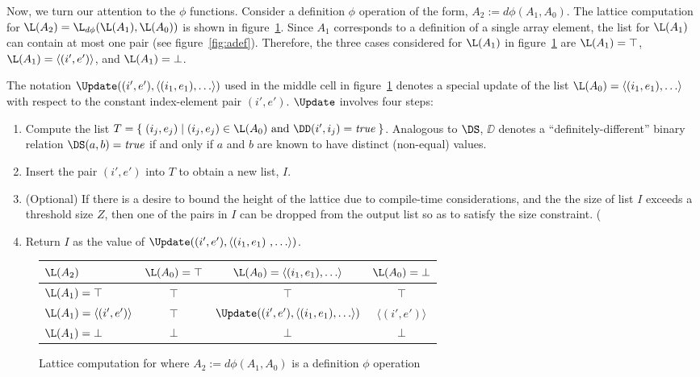 Now, we turn our attention to the $\phi$ functions. 
Consider a
definition $\phi$ operation
of the form, $A_2 := d\phi(A_1, A_0)$.  
The lattice computation for $\L(A_2) = \L_{d\phi}(\L(A_1), \L(A_0))$
is shown in figure~\ref{fig:dphi}.  Since $A_1$ corresponds to a definition
of a single array element, the list for $\L(A_1)$ can contain
at most one pair (see figure~\ref{fig:adef}).
Therefore, the three cases considered for $\L(A_1)$ in figure~\ref{fig:dphi}
are $\L(A_1) = \top$, $\L(A_1) = \langle(i',e')\rangle$, and
 $\L(A_1) = \bot$.

The notation 
$\Update((i',e'),\langle (i_1,e_1), \ldots \rangle)$
used in the middle cell in 
figure~\ref{fig:dphi} denotes a special update of 
the list $\L(A_0) = \langle (i_1,e_1), \ldots \rangle$
with respect to the constant
index-element pair $(i',e')$. $\Update$ involves four steps\label{def:update}:
\begin{enumerate}
\item Compute the list $T = \{\;(i_j,e_j)\;|\;(i_j,e_j)\in\L(A_0)
\mbox{~and~}\DD(i',i_j)=\mbox{\it true}\;\}$.  
Analogous to $\DS$, $\DD$ denotes a ``definitely-different'' binary
relation \ie $\DS(a,b) = \mbox{\it true}$ if and only if $a$ and
$b$ are known to have distinct (non-equal) values.

\item Insert the pair $(i',e')$ into $T$ to obtain a new list, $I$.
\item (Optional) If there is a desire to bound the height of the lattice due to
  compile-time considerations, and the
  the size of list
$I$ exceeds a threshold size $Z$, then one of the pairs in $I$ can be
dropped from the output list so as to satisfy the size constraint.  
(%
\item Return $I$ as the value of 
$\Update((i',e'),\langle (i_1,e_1)\
, \ldots \rangle)$.
\end{enumerate}

\begin{figure}%
\begin{center}
\begin{tabular}{|l||c|c|c|}
\hline
$\L(A_2)$ & $\L(A_0) = \top$ & $\L(A_0) = \langle (i_1,e_1), \ldots \rangle $ & $\L(A_0) = \bot$ \\
\hline \hline
$\L(A_1) = \top$ & $\top$ & $\top$ & $\top$ \\
\hline
$\L(A_1) = \langle(i',e')\rangle$ & $\top$ & $\Update((i',e'),\langle (i_1,e_1), \ldots \rangle)$ & $\langle(i',e')\rangle$ \\
\hline
$\L(A_1) = \bot$ & $\bot$ & $\bot$ & $\bot$ \\
\hline
\end{tabular}
\end{center}
\caption{Lattice computation for 
where $A_2 := d\phi(A_1, A_0)$ is
a definition $\phi$ operation}
\label{fig:dphi}
\end{figure}


